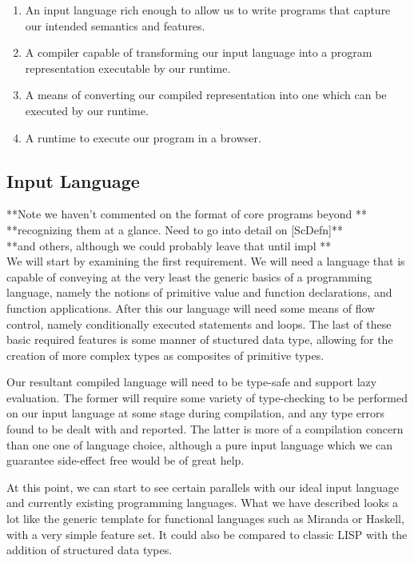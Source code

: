 \begin{enumerate}
	\item An input language rich enough to allow us to write programs
		  that capture our intended semantics and features.
	\item A compiler capable of transforming our input language into
		  a program representation executable by our runtime.
	\item A means of converting our compiled representation into one
		  which can be executed by our runtime.
	\item A runtime to execute our program in a browser. 
\end{enumerate}

\subsection{Input Language}

**Note we haven't commented on the format of core programs beyond **\\
**recognizing them at a glance. Need to go into detail on [ScDefn]**\\
**and others, although we could probably leave that until impl	  **\\

\noindent We will start by examining the first requirement. We will need a
language that is capable of conveying at the very least the generic basics 
of a programming language, namely the notions of primitive value and function
declarations, and function applications. After this our language will need
some means of flow control, namely conditionally executed statements and 
loops. The last of these basic required features is some manner of stuctured
data type, allowing for the creation of more complex types as composites of
primitive types. 

Our resultant compiled language will need to be type-safe and support lazy
evaluation. The former will require some variety of type-checking to be 
performed on our input language at some stage during compilation, and any
type errors found to be dealt with and reported. The latter is more of a 
compilation concern than one one of language choice, although a pure input
language which we can guarantee side-effect free would be of great help.

At this point, we can start to see certain parallels with our ideal input
language and currently existing programming languages. What we have described
looks a lot like the generic template for functional languages such as Miranda
or Haskell, with a very simple feature set. It could also be compared to 
classic LISP with the addition of structured data types. 

